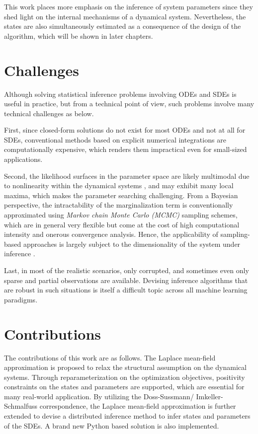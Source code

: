 This work places more emphasis on the inference of system parameters since they shed light on the internal mechanisms of a dynamical system. 
Nevertheless, the states are also simultaneously estimated as a consequence of the design of the algorithm, which will be shown in later chapters.

\section{Challenges}
\label{sec-challenges}

Although solving statistical inference problems involving ODEs and SDEs is useful in practice, but from a technical point of view, such problems involve many technical challenges as below.

First, since closed-form solutions do not exist for most ODEs and not at all for SDEs, conventional methods based on explicit numerical integrations are computationally expensive, which renders them impractical even for small-sized applications.

Second, the likelihood surfaces in the parameter space are likely multimodal due to nonlinearity within the dynamical systems \citep{calderhead2009accelerating}, and may exhibit many local maxima, which makes the parameter searching challenging.
From a Bayesian perspective, the intractability of the marginalization term is conventionally approximated using \emph{Markov chain Monte Carlo (MCMC)} sampling schemes, which are in general very flexible but come at the cost of high computational intensity and onerous convergence analysis.
Hence, the applicability of sampling-based approaches is largely subject to the dimensionality of the system under inference \citep{vrettas2015variational}. 

Last, in most of the realistic scenarios, only corrupted, and sometimes even only sparse and partial observations are available.
Devising inference algorithms that are robust in such situations is itself a difficult topic across all machine learning paradigms.

\section{Contributions}
The contributions of this work are as follows. 
The Laplace mean-field approximation is proposed to relax the structural assumption on the dynamical systems.
Through reparameterization on the optimization objectives, positivity constraints on the states and parameters are supported, which are essential for many real-world application.
By utilizing the Doss-Sussmann/ Imkeller-Schmalfuss correspondence, the Laplace mean-field approximation is further extended to devise a distributed inference method to infer states and parameters of the SDEs.
A brand new Python based solution is also implemented.

